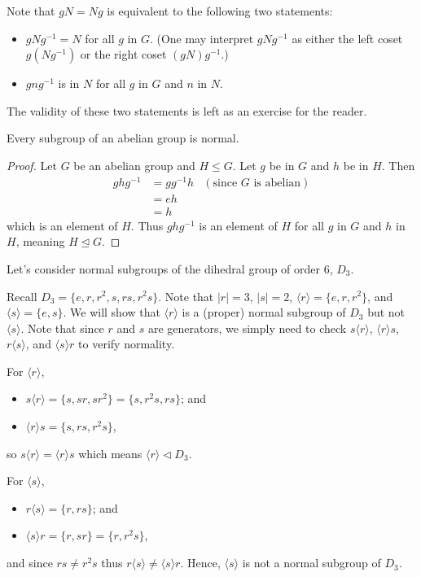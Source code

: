 Note that $gN = Ng$ is equivalent to the following two statements:
\begin{itemize}
    \item $gNg^{-1} = N$ for all $g$ in $G$. (One may interpret $gNg^{-1}$ as either the left coset $g(Ng^{-1})$ or the right coset $(gN)g^{-1}$.)
    \item $gng^{-1}$ is in $N$ for all $g$ in $G$ and $n$ in $N$.
\end{itemize}
The validity of these two statements is left as an exercise for the reader.

\begin{proposition}\label{prop-subgroup-of-abelian-group-is-normal}
    Every subgroup of an abelian group is normal.
\end{proposition}
\begin{proof}
    Let $G$ be an abelian group and $H \leq G$. Let $g$ be in $G$ and $h$ be in $H$. Then
    \begin{align*}
        ghg^{-1} &= gg^{-1}h & (\text{since }G \text{ is abelian})\\
        &= eh\\
        &= h
    \end{align*}
    which is an element of $H$. Thus $ghg^{-1}$ is an element of $H$ for all $g$ in $G$ and $h$ in $H$, meaning $H \unlhd G$.
\end{proof}

\begin{example}\label{example-normal-subgroups-of-d3}
    Let's consider normal subgroups of the dihedral group of order 6, $D_3$.

    Recall $D_3 = \{e, r, r^2, s, rs, r^2s\}$. Note that $|r| = 3$, $|s| = 2$, $\langle r \rangle = \{e, r, r^2\}$, and $\langle s \rangle = \{e, s\}$. We will show that $\langle r \rangle$ is a (proper) normal subgroup of $D_3$ but not $\langle s \rangle$. Note that since $r$ and $s$ are generators, we simply need to check $s\langle r\rangle$, $\langle r\rangle s$, $r\langle s\rangle$, and $\langle s\rangle r$ to verify normality.

    \newpage

    For $\langle r \rangle$,
    \begin{itemize}
        \item $s\langle r\rangle = \{s, sr, sr^2\} = \{s, r^2s, rs\}$; and
        \item $\langle r\rangle s = \{s, rs, r^2s\}$,
    \end{itemize}
    so $s\langle r\rangle = \langle r \rangle s$ which means $\langle r \rangle \lhd D_3$.

    For $\langle s \rangle$,
    \begin{itemize}
        \item $r\langle s\rangle = \{r, rs\}$; and
        \item $\langle s \rangle r = \{r, sr\} = \{r, r^2s\}$,
    \end{itemize}
    and since $rs \neq r^2s$ thus $r\langle s\rangle \neq \langle s \rangle r$. Hence, $\langle s \rangle$ is not a normal subgroup of $D_3$.
\end{example}

